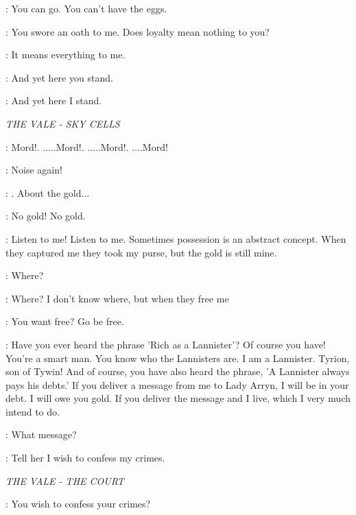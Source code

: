 \JORAH:  You can go. You can't have the eggs. 

\VISERYS:  You swore an oath to me. Does loyalty mean nothing to you? 

\JORAH:  It means everything to me. 

\VISERYS:  And yet here you stand. 

\JORAH:  And yet here I stand. 



\scene

\textit{THE VALE - SKY CELLS} 


\TYRION:  Mord!. $\ldots$..Mord!. $\ldots$..Mord!. $\ldots$.Mord! 


\MORD:  Noise again! 

\TYRION: . About the gold$\ldots$ 

\MORD:  No gold! No gold. 

\TYRION:  Listen to me! Listen to me. Sometimes possession is an abstract concept. When they captured me they took my purse, but the gold is still mine. 

\MORD: Where? 

\TYRION:  Where? I don't know where, but when they free me

\MORD:  You want free?  Go be free. 

\TYRION:  Have you ever heard the phrase 'Rich as a Lannister'?  Of course you have! You're a smart man. You know who the Lannisters are. I am a Lannister. Tyrion, son of Tywin! And of course, you have also heard the phrase, 'A Lannister always pays his debts.' If you deliver a message from me to Lady Arryn, I will be in your debt. I will owe you gold. If you deliver the message and I live, which I very much intend to do. 

\MORD: What message? 

\TYRION:  Tell her I wish to confess my crimes. 


\scene

\textit{THE VALE - THE COURT} 


\LYSA:  You wish to confess your crimes? 

